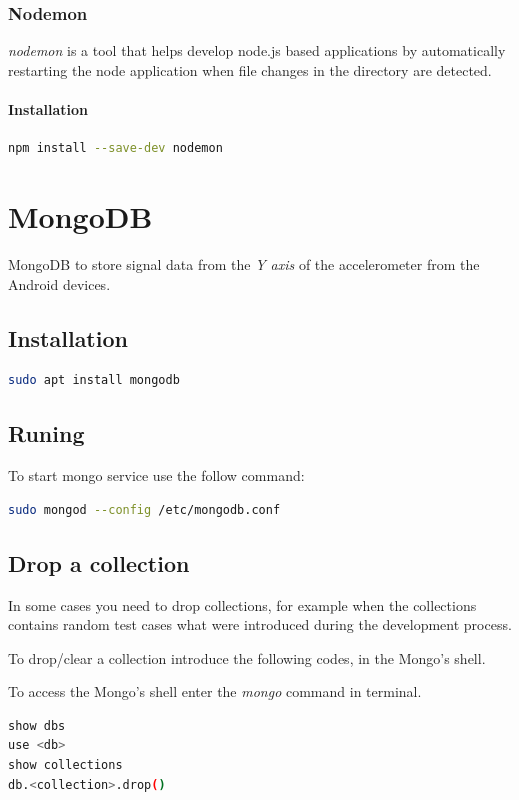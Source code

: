 \documentclass[12pt, a4paper, portrait]{article}
\begin{document}
\subsubsection{Nodemon}
\textit{nodemon} is a tool that helps develop node.js based applications by automatically restarting the node application when file changes in the directory are detected.
\paragraph{Installation}
\begin{lstlisting}[language=bash]
npm install --save-dev nodemon
\end{lstlisting}

\pagebreak
\section{MongoDB}
MongoDB to store signal data from the \textit{Y axis} of the accelerometer from the Android devices.
\subsection{Installation}
\begin{lstlisting}[language=bash]
sudo apt install mongodb
\end{lstlisting}
\subsection{Runing}
To start mongo service use the follow command:
\begin{lstlisting}[language=bash]
sudo mongod --config /etc/mongodb.conf 
\end{lstlisting}
\subsection{Drop a collection}
In some cases you need to drop collections, for example when the collections contains random test cases what were introduced during the development process.
\par To drop/clear a collection introduce the following codes, in the Mongo's shell.
\par To access the Mongo's shell enter the \textit{mongo} command in terminal.
\begin{lstlisting}[language=bash, caption=MongoDB shell commands to drop a collection]
show dbs
use <db>
show collections
db.<collection>.drop()
\end{lstlisting}
\end{document}
